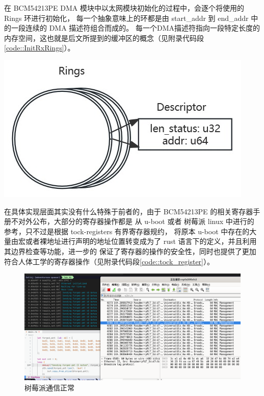     \begin{adjustwidth}{0cm}{} %
    \begin{minipage}[b]{0.5\linewidth}
        \setlength{\parindent}{2em} %
        在 BCM54213PE DMA 模块中以太网模块初始化的过程中，会逐个将使用的 Rings 环进行初始化，
        每一个抽象意味上的环都是由 start\_addr 到 end\_addr 中的一段连续的 DMA 描述符组合而成的。
        每一个DMA描述符指向一段特定长度的内存空间，这也就是后文所提到的缓冲区的概念（见附录代码段\ref{code::InitRxRings}）。

    \end{minipage}
    \hfill
    \begin{minipage}[b]{0.45\linewidth}
         \label{pict:DmaDescAndLoop}
        \includegraphics[scale=0.6]{./imgs/Rings_and_Descs.jpg}        
    \end{minipage}
    \end{adjustwidth}
    
    在具体实现层面其实没有什么特殊于前者的，由于 BCM54213PE 的相关寄存器手册不对外公布，大部分的寄存器操作都是
    从 u-boot 或者 树莓派 linux 中进行的参考，只不过是根据 tock-registers 有界寄存器规约，
    将原本 u-boot 中存在的大量由宏或者裸地址进行声明的地址位置转变成为了 rust 语言下的定义，并且利用其边界检查等功能，进一步的
    保证了寄存器的操作的安全性，同时也提供了更加符合人体工学的寄存器操作（见附录代码段\ref{code::tock_register}）。

    \begin{figure}[ht]
        \centering
        \includegraphics[scale=0.3]{./imgs/树莓派通信正常.jpg}
        \caption{树莓派通信正常}    \label{fig::树莓派通信正常}
    \end{figure}

